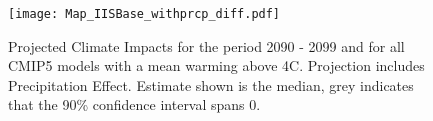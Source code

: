\documentclass[11pt, letterpaper]{article}
\numberwithin{algorithm}{section}
\numberwithin{assumption}{section}
\numberwithin{lemma}{section}
\numberwithin{theorem}{section}
\numberwithin{corollary}{section}
\numberwithin{remark}{section}
\numberwithin{equation}{section}
\numberwithin{figure}{section}
\numberwithin{table}{section}
\begin{document}
\begin{figure}[!htbp]  \vspace{-.35in}
\centering
\texttt{[image: Map\_IISBase\_withprcp\_diff.pdf]}
\caption{Projected Climate Impacts for the period 2090 - 2099 and for all CMIP5 models with a mean warming above 4\textdegree C. Projection includes Precipitation Effect. Estimate shown is the median, grey indicates that the 90\% confidence interval spans 0.}
\label{fig_projection_map_withprcp}
\end{figure}
\end{document}
